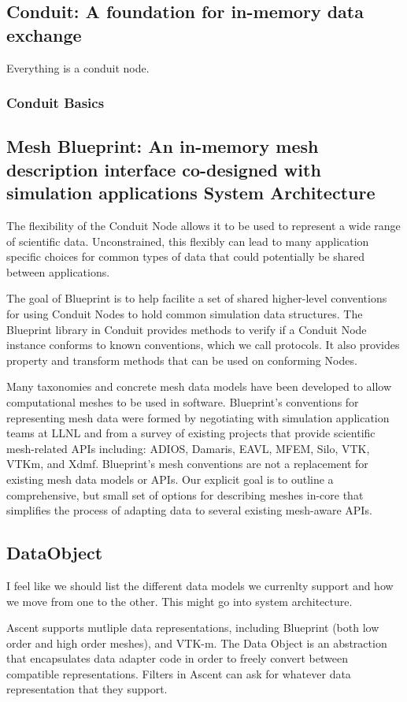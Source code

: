 \subsection{Conduit: A foundation for in-memory data exchange}
Everything is a conduit node.

\subsubsection{Conduit Basics}
%

\subsection{Mesh Blueprint: An in-memory mesh description interface co-designed with simulation applications
System Architecture}

The flexibility of the Conduit Node allows it to be used to represent a
wide range of scientific data.
%
Unconstrained, this flexibly can lead to
many application specific choices for common types of data that could
potentially be shared between applications.

The goal of Blueprint is to help facilite a set of shared higher-level
conventions for using Conduit Nodes to hold common simulation data structures.
%
The Blueprint library in Conduit provides methods to verify if a Conduit
Node instance conforms to known conventions, which we call protocols.
%
It also provides property and transform methods that can be used on conforming Nodes.

Many taxonomies and concrete mesh data models have been developed to allow
computational meshes to be used in software.
%
Blueprint’s conventions for representing mesh data were formed by negotiating
with simulation application teams at LLNL and from a survey of existing
projects that provide scientific mesh-related APIs including: ADIOS, Damaris,
EAVL, MFEM, Silo, VTK, VTKm, and Xdmf.
%
Blueprint’s mesh conventions are not a replacement for existing mesh data
models or APIs.
%
Our explicit goal is to outline a comprehensive, but small set of options
for describing meshes in-core that simplifies the process of adapting data
to several existing mesh-aware APIs.

\subsection{DataObject}

I feel like we should list the different data models we currenlty support and how we
move from one to the other.
%
This might go into system architecture.

Ascent supports mutliple data representations, including Blueprint (both low
order and high order meshes), and VTK-m.
%
The Data Object is an abstraction that encapsulates data adapter code in order
to freely convert between compatible representations.
%
Filters in Ascent can ask for whatever data representation that they
support.


